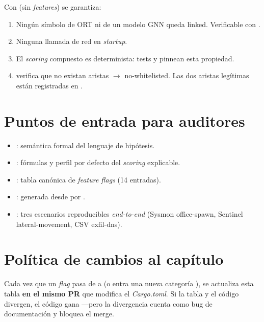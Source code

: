 Con  (sin \emph{features}) se garantiza:

\begin{enumerate}
    \item Ningún símbolo de ORT ni de un modelo GNN queda linked.
    Verificable con .
    \item Ninguna llamada de red en \emph{startup}.
    \item El \emph{scoring} compuesto es determinista: tests
     y
    pinnean esta propiedad.
    \item {} verifica que no existan
    aristas  $\to$  no-whitelisted.
    Las dos aristas legítimas están registradas en
    .
\end{enumerate}

\section{Puntos de entrada para auditores}

\begin{itemize}
    \item {}: semántica formal
    del lenguaje de hipótesis.
    \item {}: fórmulas y perfil por
    defecto del \emph{scoring} explicable.
    \item {}: tabla canónica de
    \emph{feature flags} (14 entradas).
    \item {}: generada desde
     por
    .
    \item {}: tres escenarios reproducibles
    \emph{end-to-end} (Sysmon office-spawn, Sentinel lateral-movement,
    CSV exfil-dns).
\end{itemize}

\section{Política de cambios al capítulo}

Cada vez que un \emph{flag} pasa de  a
 (o entra una nueva categoría ), se
actualiza esta tabla \textbf{en el mismo PR} que modifica el
\emph{Cargo.toml}. Si la tabla y el código divergen, el código gana
---pero la divergencia cuenta como bug de documentación y bloquea
el merge.
